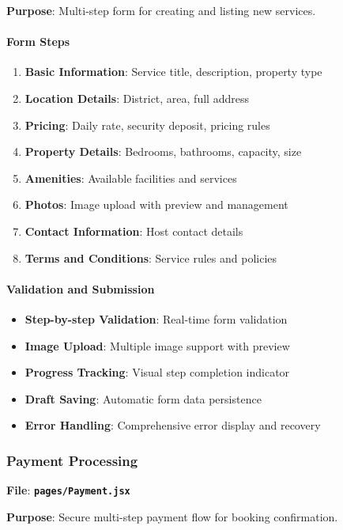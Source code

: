 \documentclass[12pt,a4paper]{article}
\newcommand{\file}[1]{\textbf{\texttt{#1}}}
\begin{document}
\textbf{Purpose}: Multi-step form for creating and listing new services.

\paragraph{Form Steps}
\begin{enumerate}
\item \textbf{Basic Information}: Service title, description, property type
\item \textbf{Location Details}: District, area, full address
\item \textbf{Pricing}: Daily rate, security deposit, pricing rules
\item \textbf{Property Details}: Bedrooms, bathrooms, capacity, size
\item \textbf{Amenities}: Available facilities and services
\item \textbf{Photos}: Image upload with preview and management
\item \textbf{Contact Information}: Host contact details
\item \textbf{Terms and Conditions}: Service rules and policies
\end{enumerate}

\paragraph{Validation and Submission}
\begin{itemize}
\item \textbf{Step-by-step Validation}: Real-time form validation
\item \textbf{Image Upload}: Multiple image support with preview
\item \textbf{Progress Tracking}: Visual step completion indicator
\item \textbf{Draft Saving}: Automatic form data persistence
\item \textbf{Error Handling}: Comprehensive error display and recovery
\end{itemize}

\subsubsection{Payment Processing}
\label{subsubsec:payment-processing}

\textbf{File}: \file{pages/Payment.jsx}

\textbf{Purpose}: Secure multi-step payment flow for booking confirmation.
\end{document}
